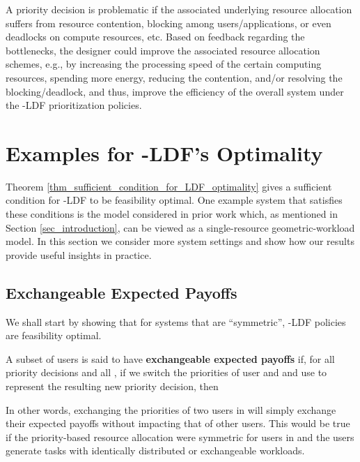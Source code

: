 \documentclass[prodmode,acmtompecs]{acmsmall}
\newcommand{\myComments}[1]{}
\newif\ifdissertation
\newcommand{\dissertationStart}{\ifdissertation  \myComments{Dissertation version: }}
\newcommand{\commentEnd}{\myComments{End}}
\begin{document}
A priority decision is problematic if the associated underlying resource allocation suffers from resource contention, blocking among users/applications, or even deadlocks on compute resources, etc. 
Based on feedback regarding the bottlenecks, the designer could improve the associated resource allocation schemes, e.g., by increasing the processing speed of the certain computing resources, spending more energy, reducing the contention, and/or resolving the blocking/deadlock, and thus, improve the efficiency of the overall system under the -LDF prioritization policies.  

\section{Examples for -LDF's Optimality}
Theorem \ref{thm_sufficient_condition_for_LDF_optimality} gives a sufficient condition for -LDF to be feasibility optimal. 
One example system that satisfies these conditions is the model considered in prior work \cite{HoK12} which, as mentioned in Section \ref{sec_introduction}, can be viewed as a single-resource geometric-workload model. 
In this section we consider more system settings and show how our results provide useful insights in practice. 
\dissertationStart
Theorem \ref{thm_sufficient_condition_for_LDF_optimality} gives us a sufficient condition for -LDF policies to be feasibility optimal. In this section we consider the soft real-time setting and discuss several examples that satisfy those conditions. 

Recall that in SRT setting users are periodically generating streams of tasks that need to complete before deadline and  represents the expected number of tasks/sub-tasks completed on time, or the expected quality of task processing results per period under priority decision . To verify the conditions in Theorem \ref{thm_sufficient_condition_for_LDF_optimality}, we verify the subset payoff equivalence property. 
\commentEnd\fi

\subsection{Exchangeable Expected Payoffs}

We shall start by showing that for systems that are ``symmetric'', -LDF policies are feasibility optimal. 

\begin{definition}
A subset of users  is said to have {\bf exchangeable expected payoffs} if, for all priority decisions  and all , if we switch the priorities of user  and  and use  to represent the resulting new priority decision, then

\end{definition}
In other words, exchanging the priorities of two users in  will simply exchange their expected payoffs without impacting that of other users. 
This would be true if the priority-based resource allocation were symmetric for users in  and the users generate tasks with identically distributed or exchangeable workloads. 
\end{document}

